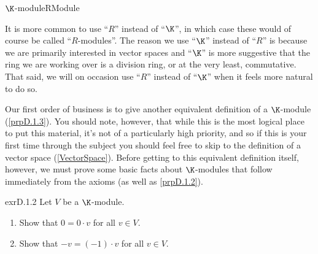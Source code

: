 \begin{dfn}{$\K$-module}{RModule}
\begin{rmk}
	\end{rmk}
	\begin{rmk}
		It is more common to use ``$R$'' instead of ``$\K$'', in which case these would of course be called ``$R$-modules''.  The reason we use ``$\K$'' instead of ``$R$'' is because we are primarily interested in vector spaces and ``$\K$'' is more suggestive that the ring we are working over is a division ring, or at the very least, commutative.  That said, we will on occasion use ``$R$'' instead of ``$\K$'' when it feels more natural to do so.
	\end{rmk}
\end{dfn}

Our first order of business is to give another equivalent definition of a $\K$-module (\cref{prpD.1.3}).  You should note, however, that while this is the most logical place to put this material, it's not of a particularly high priority, and so if this is your first time through the subject you should feel free to skip to the definition of a vector space (\cref{VectorSpace}).  Before getting to this equivalent definition itself, however, we must prove some basic facts about $\K$-modules that follow immediately from the axioms (as well as \cref{prpD.1.2}).
\begin{exr}{}{exrD.1.2}
	Let $V$ be a $\K$-module.
	\begin{enumerate}
		\item Show that $0=0\cdot v$ for all $v\in V$.
		\item Show that $-v=(-1)\cdot v$ for all $v\in V$.
	\end{enumerate}
\end{exr}
